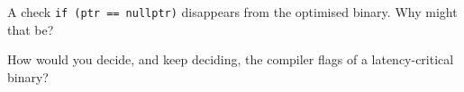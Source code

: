 \begin{interviewq}\label{iq:ll:cpp-for-latency-iii-the-compiler:5}
A check \texttt{if (ptr == nullptr)} disappears from the optimised binary. Why might that be?
\end{interviewq}

\begin{interviewq}\label{iq:ll:cpp-for-latency-iii-the-compiler:6}
How would you decide, and keep deciding, the compiler flags of a latency-critical binary?
\end{interviewq}
